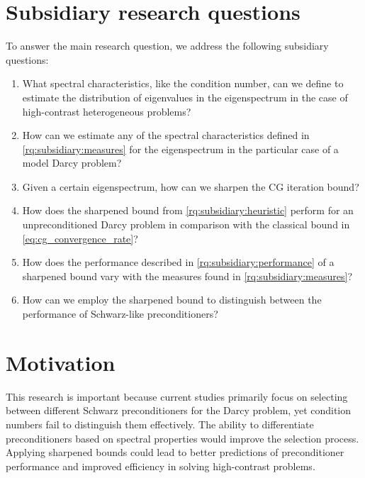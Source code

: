 \section{Subsidiary research questions}
\begin{subsidiaryq} \label{rq:subsidiaries}
    To answer the main research question, we address the following subsidiary questions:
    \setlength\itemindent{1in}
    \begin{enumerate}[label=\textbf{Q\arabic*}, ref=Q\arabic*, leftmargin=1cm]
        \item\label{rq:subsidiary:measures} What spectral characteristics, like the condition number, can we define to estimate the distribution of eigenvalues in the eigenspectrum in the case of high-contrast heterogeneous problems?
        \item\label{rq:subsidiary:estimation} How can we estimate any of the spectral characteristics defined in \ref{rq:subsidiary:measures} for the eigenspectrum in the particular case of a model Darcy problem?
        \item\label{rq:subsidiary:heuristic} Given a certain eigenspectrum, how can we sharpen the CG iteration bound?
        \item\label{rq:subsidiary:performance} How does the sharpened bound from \ref{rq:subsidiary:heuristic} perform for an unpreconditioned Darcy problem in comparison with the classical bound in \cref{eq:cg_convergence_rate}?
        \item\label{rq:subsidiary:dependance} How does the performance described in \ref{rq:subsidiary:performance} of a sharpened bound vary with the measures found in \ref{rq:subsidiary:measures}?
        \item\label{rq:subsidiary:preconditioners} How can we employ the sharpened bound to distinguish between the performance of Schwarz-like preconditioners? 
    \end{enumerate}
\end{subsidiaryq}

\section{Motivation}
This research is important because current studies primarily focus on selecting between different Schwarz preconditioners for the Darcy problem, yet condition numbers fail to distinguish them effectively. The ability to differentiate preconditioners based on spectral properties would improve the selection process. Applying sharpened bounds could lead to better predictions of preconditioner performance and improved efficiency in solving high-contrast problems.

